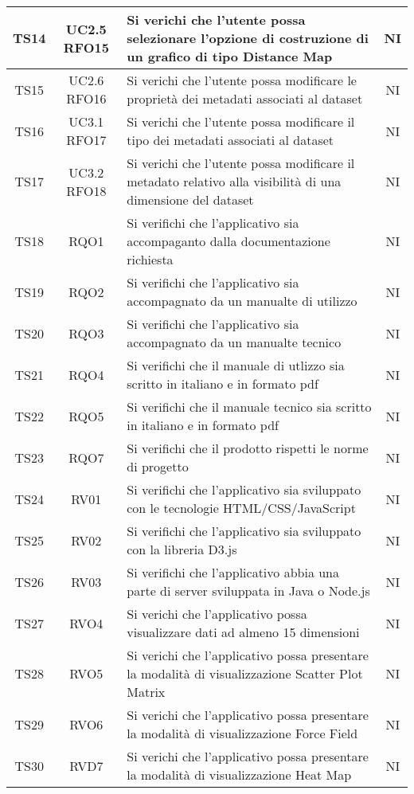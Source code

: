\documentclass[../piano_di_qualifica.tex]{subfiles}
\begin{document}
\begin{center}
\begin{longtable}{|c|c|p{8.5cm}|c|}
		TS14  & UC2.5 RFO15 & Si verichi che l'utente possa selezionare l’opzione di costruzione di un grafico di tipo Distance Map & NI \\ \hline
		TS15 & UC2.6 RFO16 & Si verichi che l'utente possa modificare le proprietà dei metadati associati al dataset  & NI \\ \hline
		TS16 & UC3.1 RFO17 & Si verichi che l'utente possa modificare il tipo dei metadati associati al dataset & NI \\ \hline
		TS17 & UC3.2 RFO18 & Si verichi che l'utente possa modificare il metadato relativo alla visibilità di una dimensione del dataset & NI \\ \hline
		TS18  & RQO1  & Si verifichi che l'applicativo sia accompaganto dalla documentazione richiesta   & NI \\ \hline
      		TS19  & RQO2  & Si verifichi che l'applicativo sia accompagnato da un manualte di utilizzo  & NI \\ \hline
      		TS20  & RQO3  & Si verifichi che l'applicativo sia accompagnato da un manualte tecnico    & NI \\ \hline
      		TS21  & RQO4  & Si verifichi che il manuale di utlizzo sia scritto in italiano e in formato pdf     & NI \\ \hline
      		TS22  & RQO5  & Si verifichi che il manuale tecnico sia scritto in italiano e in formato pdf  & NI \\ \hline
      		TS23  & RQO7  & Si verifichi che il prodotto rispetti le norme di progetto    & NI \\   \hline
			TS24   & RV01  & Si verifichi che l'applicativo sia sviluppato con le tecnologie HTML/CSS/JavaScript  & NI \\ \hline	
      		TS25   & RV02   & Si verifichi che l'applicativo sia sviluppato con la libreria D3.js   & NI \\ \hline
      		TS26   & RV03    & Si verifichi che l'applicativo abbia una parte di server sviluppata in Java o Node.js   & NI \\ \hline
		TS27  & RVO4 & Si verichi che l’applicativo possa visualizzare dati ad almeno 15 dimensioni & NI \\ \hline
		TS28  & RVO5 & Si verichi che l’applicativo possa presentare la modalità di visualizzazione Scatter Plot Matrix & NI \\ \hline
		TS29  & RVO6 & Si verichi che l’applicativo possa presentare la modalità di visualizzazione Force Field & NI \\ \hline
		TS30  & RVD7 & Si verichi che l’applicativo possa presentare la modalità di visualizzazione Heat Map & NI \\ \hline

\end{longtable}
\end{center}
\end{document}
